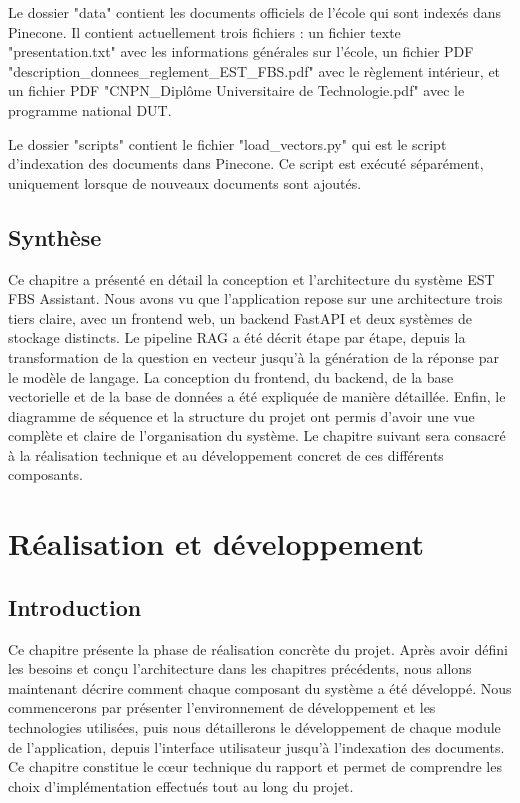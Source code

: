 \documentclass[12pt, a4paper, twoside]{report}
\begin{document}
Le dossier "data" contient les documents officiels de l'école qui sont indexés dans Pinecone. Il contient actuellement trois fichiers : un fichier texte "presentation.txt" avec les informations générales sur l'école, un fichier PDF "description\_donnees\_reglement\_EST\_FBS.pdf" avec le règlement intérieur, et un fichier PDF "CNPN\_Diplôme Universitaire de Technologie.pdf" avec le programme national DUT.

Le dossier "scripts" contient le fichier "load\_vectors.py" qui est le script d'indexation des documents dans Pinecone. Ce script est exécuté séparément, uniquement lorsque de nouveaux documents sont ajoutés.

\section{Synthèse}
Ce chapitre a présenté en détail la conception et l'architecture du système EST FBS Assistant. Nous avons vu que l'application repose sur une architecture trois tiers claire, avec un frontend web, un backend FastAPI et deux systèmes de stockage distincts. Le pipeline RAG a été décrit étape par étape, depuis la transformation de la question en vecteur jusqu'à la génération de la réponse par le modèle de langage. La conception du frontend, du backend, de la base vectorielle et de la base de données a été expliquée de manière détaillée. Enfin, le diagramme de séquence et la structure du projet ont permis d'avoir une vue complète et claire de l'organisation du système. Le chapitre suivant sera consacré à la réalisation technique et au développement concret de ces différents composants.

\chapter{Réalisation et développement}

\section{Introduction}
Ce chapitre présente la phase de réalisation concrète du projet. Après avoir défini les besoins et conçu l'architecture dans les chapitres précédents, nous allons maintenant décrire comment chaque composant du système a été développé. Nous commencerons par présenter l'environnement de développement et les technologies utilisées, puis nous détaillerons le développement de chaque module de l'application, depuis l'interface utilisateur jusqu'à l'indexation des documents. Ce chapitre constitue le cœur technique du rapport et permet de comprendre les choix d'implémentation effectués tout au long du projet.
\end{document}
